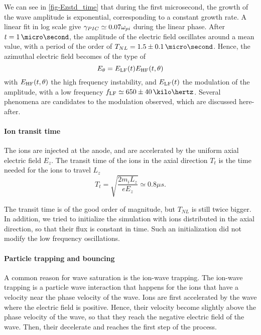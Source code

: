   We can see in \cref{fig-Ezstd_time} that during the first microsecond, the growth of the wave amplitude is exponential, corresponding to a constant growth rate.
  A linear fit in log scale give $\gamma_{PIC} \simeq 0.07 \omega_{pi}$ during the linear phase.
  After $t=1\,\micro\second$, the amplitude of the electric field oscillates around a mean value, with a period of the order of $T_{NL}=1.5 \pm 0.1 \,\micro\second$.
  Hence, the azimuthal electric field becomes of the type of
  \[  E_{\theta} = E_{\rm LF}(t) E_{\rm HF}(t, {\theta}) \]
  with $E_{\rm HF}(t, \theta) $ the high frequency instability, and $E_{\rm LF}(t)$ the modulation of the amplitude, with a low frequency $f_{\rm LF} \simeq  650 \pm 40 \,\kilo\hertz$.
  Several phenomena are candidates to the modulation observed, which are discussed here-after.
  
  
  \paragraph{Ion transit time\\}
    The ions are injected at the anode, and are accelerated by the uniform axial electric field $E_z$.
    The transit time of the ions in the axial direction $T_t$  is the time needed for the ions to travel $L_z$
    \begin{equation} \label{eq-transittime}
      T_{t} = \sqrt{\frac{2 m_i L_z}{e E_z}} \simeq 0.8 \mu s.
    \end{equation}
    
    The transit time is of the good  order of magnitude, but $T_{NL}$ is still twice bigger.
    In addition, we tried to initialize the simulation with ions distributed in the axial direction, so that their flux is constant in time.
    Such an initialization did not modify the low frequency oscillations.
    
  \paragraph{Particle trapping and bouncing\\}
    A common reason for wave saturation is the ion-wave trapping.
    The ion-wave trapping is a particle wave interaction that happens for the ions that have a velocity near the phase velocity of the wave.
    Ions are first accelerated by the wave where the electric field is positive.
    Hence, their velocity become slightly above the phase velocity of the wave, so that they reach the negative electric field of the wave.
    Then, their decelerate and reaches the first step of the process. 
    
